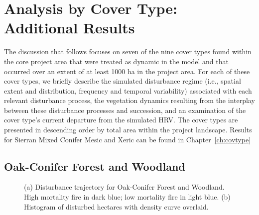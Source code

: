 \chapter{Analysis by Cover Type: Additional Results}
\label{app:covtype_analysis}

The discussion that follows focuses on seven of the nine cover types found within the core project area that were treated as dynamic in the model and that occurred over an extent of at least 1000 ha in the project area. For each of these cover types, we briefly describe the simulated disturbance regime (i.e., spatial extent and distribution, frequency and temporal variability) associated with each relevant disturbance process, the vegetation dynamics resulting from the interplay between these disturbance processes and succession, and an examination of the cover type’s current departure from the simulated HRV. The cover types are presented in descending order by total area within the project landscape. Results for Sierran Mixed Conifer Mesic and Xeric can be found in Chapter~\ref{ch:covtype}


\section{Oak-Conifer Forest and Woodland} 

\begin{figure}[!htbp]
  \centering
  \caption{\small (a) Disturbance trajectory for Oak-Conifer Forest and Woodland. High mortality fire in dark blue; low mortality fire in light blue. (b) Histogram of disturbed hectares with density curve overlaid.} 
  \label{fig:darea_ocfw}
\end{figure}

